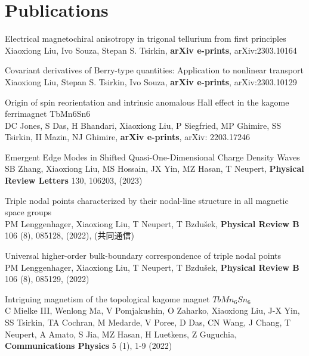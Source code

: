 \documentclass[11pt,a4paper,sans]{moderncv} %
\begin{document}
\newpage

\section{Publications}

\begin{etaremune}
  \setlength{\itemsep}{5pt}
  \item Electrical magnetochiral anisotropy in trigonal tellurium from first principles\\ \textcolor{cvblue}{Xiaoxiong Liu}, Ivo Souza, Stepan S. Tsirkin, \textbf{arXiv e-prints}, arXiv:2303.10164
  \item Covariant derivatives of Berry-type quantities: Application to nonlinear transport\\ \textcolor{cvblue}{Xiaoxiong Liu}, Stepan S. Tsirkin, Ivo Souza, \textbf{arXiv e-prints}, arXiv:2303.10129
   \item Origin of spin reorientation and intrinsic anomalous Hall effect in the kagome ferrimagnet TbMn6Sn6\\ DC Jones, S Das, H Bhandari, \textcolor{cvblue}{Xiaoxiong Liu}, P Siegfried, MP Ghimire, SS Tsirkin, II Mazin, NJ Ghimire, \textbf{arXiv e-prints}, arXiv: 2203.17246
  \item Emergent Edge Modes in Shifted Quasi-One-Dimensional Charge Density Waves\\ SB Zhang, \textcolor{cvblue}{Xiaoxiong Liu}, MS Hossain, JX Yin, MZ Hasan, T Neupert, \textbf{Physical Review Letters}  130, 106203, (2023)
   \item Triple nodal points characterized by their nodal-line structure in all magnetic space groups\\ PM Lenggenhager, \textcolor{cvblue}{Xiaoxiong Liu}, T Neupert, T Bzdušek,  \textbf{Physical Review B} 106 (8), 085128, (2022), (共同通信)
  \item Universal higher-order bulk-boundary correspondence of triple nodal points\\ PM Lenggenhager, \textcolor{cvblue}{Xiaoxiong Liu}, T Neupert, T Bzdušek, \textbf{Physical Review B} 106 (8), 085129, (2022)
  \item Intriguing magnetism of the topological kagome magnet $TbMn_6Sn_6$\\ C Mielke III, Wenlong Ma, V Pomjakushin, O Zaharko, \textcolor{cvblue}{Xiaoxiong Liu}, J-X Yin, SS Tsirkin, TA Cochran, M Medarde, V Poree, D Das, CN Wang, J Chang, T Neupert, A Amato, S Jia, MZ Hasan, H Luetkens, Z Guguchia, \textbf{Communications Physics} 5 (1), 1-9 (2022)

\end{etaremune}
\end{document}
